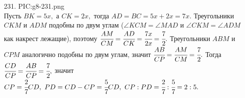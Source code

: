 231. {{PIC:g8-231.png}}\\
Пусть $BK=5x,$ а $CK=2x,$ тогда $AD=BC=5x+2x=7x.$ Треугольники $CKM$ и $ADM$ подобны по двум углам ($\angle KCM=\angle MAD$ и $\angle CKM=\angle ADM$ как накрест лежащие), поэтому $\cfrac{AM}{CM}=\cfrac{AD}{CK}=\cfrac{7x}{2x}=\cfrac{7}{2}.$ Треугольники $ABM$ и $CPM$ аналогично подобны по двум углам, значит $\cfrac{AB}{CP}=\cfrac{AM}{CM}=\cfrac{7}{2}.$ Тогда $\cfrac{CD}{CP}=\cfrac{AB}{CP}=\cfrac{7}{2},$ значит $CP=\cfrac{2}{7}CD,\ PD=CD-CP=\cfrac{5}{7}CD,\ CP:PD=\cfrac{2}{7}:\cfrac{5}{7}=2:5.$\\
